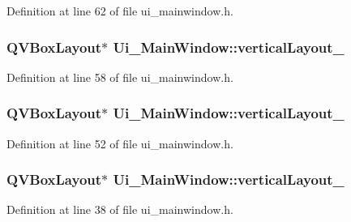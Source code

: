 Definition at line 62 of file ui\+\_\+mainwindow.\+h.

\hypertarget{class_ui___main_window_a7b66d5d6ab55f3977317359d09a42345}{}
\subsubsection[{vertical\+Layout\+\_\+7}]{\setlength{\rightskip}{0pt plus 5cm}Q\+V\+Box\+Layout$\ast$ Ui\+\_\+\+Main\+Window\+::vertical\+Layout\+\_}\label{class_ui___main_window_a7b66d5d6ab55f3977317359d09a42345}


Definition at line 58 of file ui\+\_\+mainwindow.\+h.

\hypertarget{class_ui___main_window_aaa8cc393d5a44562d629a9f646d2c6dd}{}
\subsubsection[{vertical\+Layout\+\_\+8}]{\setlength{\rightskip}{0pt plus 5cm}Q\+V\+Box\+Layout$\ast$ Ui\+\_\+\+Main\+Window\+::vertical\+Layout\+\_}\label{class_ui___main_window_aaa8cc393d5a44562d629a9f646d2c6dd}


Definition at line 52 of file ui\+\_\+mainwindow.\+h.

\hypertarget{class_ui___main_window_afb1464f1d82290bdb55ce9c30a62c2c5}{}
\subsubsection[{vertical\+Layout\+\_\+9}]{\setlength{\rightskip}{0pt plus 5cm}Q\+V\+Box\+Layout$\ast$ Ui\+\_\+\+Main\+Window\+::vertical\+Layout\+\_}\label{class_ui___main_window_afb1464f1d82290bdb55ce9c30a62c2c5}


Definition at line 38 of file ui\+\_\+mainwindow.\+h.

\hypertarget{class_ui___main_window_a8384329c3663ff274e926a12024aab52}{}
